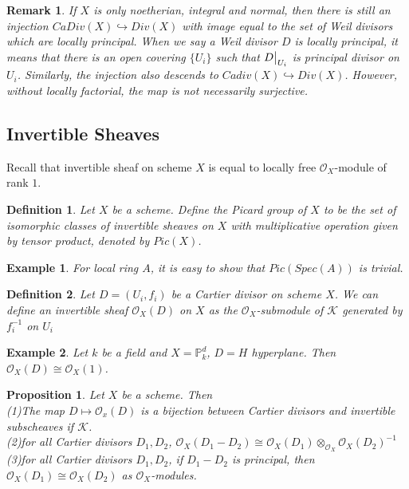 \documentclass{ctexart}
\newtheorem{definition}{Definition}[section]
\newtheorem{remark}{Remark}[section]
\newtheorem{proposition}{Proposition}[section]
\newtheorem{example}{Example}[section]
\begin{document}
\begin{remark}
    If $X$ is only noetherian, integral and normal, then there is still an injection $CaDiv(X) \hookrightarrow Div(X)$ with image equal to the set of Weil divisors which are locally principal.
    When we say a Weil divisor $D$ is locally principal, it means that there is an open covering $\{U_{i}\}$ such that $D\big{|}_{U_{i}}$ is principal divisor on $U_{i}$.
    Similarly, the injection also descends to $Cadiv(X) \hookrightarrow Div(X)$.
    However, without locally factorial, the map is not necessarily surjective.
\end{remark}
\subsection{Invertible Sheaves}
Recall that invertible sheaf on scheme $X$ is equal to locally free $\mathcal{O}_{X}$-module of rank $1$.
\begin{definition}
    Let $X$ be a scheme.
    Define the Picard group of $X$ to be the set of isomorphic classes of invertible sheaves on $X$ with multiplicative operation given by tensor product, denoted by $Pic(X)$.
\end{definition} 
\begin{example}
    For local ring $A$, it is easy to show that $Pic(Spec(A))$ is trivial.
\end{example}
\begin{definition}
    Let $D = (U_{i}, f_{i})$ be a Cartier divisor on scheme $X$.
    We can define an invertible sheaf $\mathcal{O}_{X}(D)$ on $X$ as the $\mathcal{O}_{X}$-submodule of $\mathcal{K}$ generated by $f_{i}^{-1}$ on $U_{i}$
\end{definition}
\begin{example}
    Let $k$ be a field and $X = \mathbb{P}_{k}^{d}$, $D = H$ hyperplane.
    Then $\mathcal{O}_{X}(D) \cong \mathcal{O}_{X}(1)$.
\end{example}
\begin{proposition}
    Let $X$ be a scheme.
    Then \\
    (1)The map $D \longmapsto \mathcal{O}_{x}(D)$ is a bijection between Cartier divisors and invertible subscheaves if $\mathcal{K}$. \\
    (2)for all Cartier divisors $D_{1}, D_{2}$, $\mathcal{O}_{X}(D_{1} - D_{2}) \cong \mathcal{O}_{X}(D_{1}) \otimes_{\mathcal{O}_{X}} \mathcal{O}_{X}(D_{2})^{-1}$ \\
    (3)for all Cartier divisors $D_{1}, D_{2}$, if $D_{1} - D_{2}$ is principal, then $\mathcal{O}_{X}(D_{1}) \cong \mathcal{O}_{X}(D_{2})$ as $\mathcal{O}_{X}$-modules.
    \label{Proposition 8.4}
\end{proposition}
\end{document}
